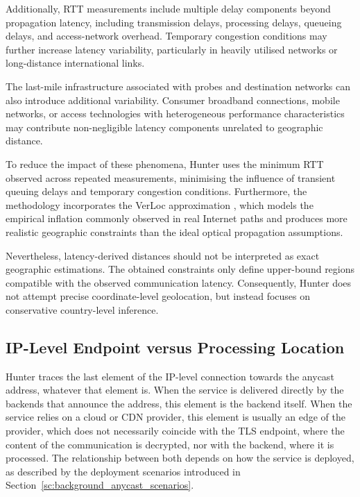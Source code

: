 Additionally, RTT measurements include multiple delay components beyond propagation latency, including transmission delays, processing delays, queueing delays, and access-network overhead. Temporary congestion conditions may further increase latency variability, particularly in heavily utilised networks or long-distance international links.

The last-mile infrastructure associated with probes and destination networks can also introduce additional variability. Consumer broadband connections, mobile networks, or access technologies with heterogeneous performance characteristics may contribute non-negligible latency components unrelated to geographic distance.

To reduce the impact of these phenomena, Hunter uses the minimum RTT observed across repeated measurements, minimising the influence of transient queuing delays and temporary congestion conditions. Furthermore, the methodology incorporates the VerLoc approximation \cite{Kohls2022VerLoc:Systems}, which models the empirical inflation commonly observed in real Internet paths and produces more realistic geographic constraints than the ideal optical propagation assumptions.

Nevertheless, latency-derived distances should not be interpreted as exact geographic estimations. The obtained constraints only define upper-bound regions compatible with the observed communication latency. Consequently, Hunter does not attempt precise coordinate-level geolocation, but instead focuses on conservative country-level inference.

\subsection{IP-Level Endpoint versus Processing Location}
\label{sc:hunter_limitations_ingress}

Hunter traces the last element of the IP-level connection towards the anycast address, whatever that element is. When the service is delivered directly by the backends that announce the address, this element is the backend itself. When the service relies on a cloud or CDN provider, this element is usually an edge of the provider, which does not necessarily coincide with the TLS endpoint, where the content of the communication is decrypted, nor with the backend, where it is processed. The relationship between both depends on how the service is deployed, as described by the deployment scenarios introduced in Section~\ref{sc:background_anycast_scenarios}.

